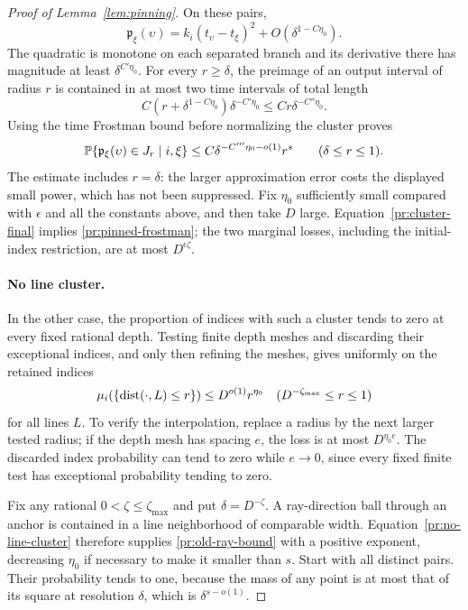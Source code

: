 \begin{proof}[Proof of Lemma~\ref{lem:pinning}]
On these pairs,
\[
 \mathfrak p_\xi(\upsilon)
  =k_i(t_\upsilon-t_\xi)^2
       +O(\delta^{1-C\eta_0}).
\]
The quadratic is monotone on each separated branch and its
derivative there has magnitude at least $\delta^{C'\eta_0}$.
For every $r\ge\delta$, the preimage of an output interval of
radius $r$ is contained in at most two time intervals of total
length
\[
 C(r+\delta^{1-C\eta_0})\delta^{-C'\eta_0}
 \le Cr\delta^{-C''\eta_0}.
\]
Using the time Frostman bound before normalizing the cluster proves
\begin{equation}
 \mathbb P\{\mathfrak p_\xi(\upsilon)\in J_r\mid i,\xi\}
   \le C\delta^{-C'''\eta_0-o(1)}r^s
   \qquad(\delta\le r\le1).
\label{pr:cluster-final}
\end{equation}
The estimate includes $r=\delta$: the larger approximation error
costs the displayed small power, which has not been suppressed.
Fix $\eta_0$ sufficiently small compared with $\epsilon$ and all
the constants above, and then take $D$ large.
Equation~\eqref{pr:cluster-final} implies
\eqref{pr:pinned-frostman}; the two marginal losses, including the
initial-index restriction, are at most $D^{\epsilon\zeta}$.

\paragraph{No line cluster.}
In the other case, the proportion of indices with such a cluster
tends to zero at every fixed rational depth. Testing finite depth
meshes and discarding their exceptional indices, and only then
refining the meshes, gives uniformly on the retained indices
\begin{equation}
 \mu_i(\{\operatorname{dist}(\cdot,L)\le r\})
     \le D^{o(1)}r^{\eta_0}
 \quad(D^{-\zeta_{\max}}\le r\le1)
\label{pr:no-line-cluster}
\end{equation}
for all lines $L$. To verify the interpolation, replace a radius by
the next larger tested radius; if the depth mesh has spacing $e$,
the loss is at most $D^{\eta_0e}$. The discarded index probability
can tend to zero while $e\to0$, since every fixed finite test has
exceptional probability tending to zero.

Fix any rational $0<\zeta\le\zeta_{\max}$ and put
$\delta=D^{-\zeta}$. A ray-direction ball through an anchor is
contained in a line neighborhood of comparable width.
Equation~\eqref{pr:no-line-cluster} therefore supplies
\eqref{pr:old-ray-bound} with a positive exponent, decreasing
$\eta_0$ if necessary to make it smaller than $s$.
Start with all distinct pairs. Their probability tends to one,
because the mass of any point is at most that of its square at
resolution $\delta$, which is $\delta^{s-o(1)}$.


\end{proof}
